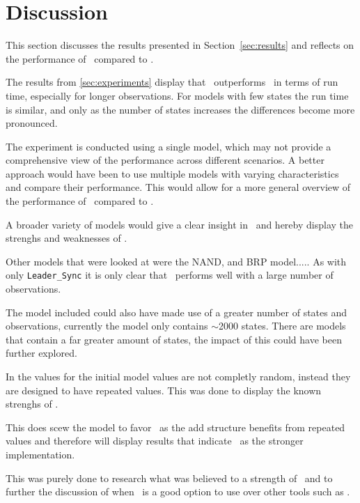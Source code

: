 \section{Discussion}\label{sec:discussion}
This section discusses the results presented in Section~\ref{sec:results} and reflects on the performance of \Cupaal\ compared to \Jajapy.

The results from \autoref{sec:experiments} display that \Cupaal\ outperforms \Jajapy\ in terms of run time, especially for longer observations.
For models with few states the run time is similar, and only as the number of states increases the differences become more pronounced.

The experiment is conducted using a single model, which may not provide a comprehensive view of the performance across different scenarios.
A better approach would have been to use multiple models with varying characteristics and compare their performance.
This would allow for a more general overview of the performance of \Cupaal\ compared to \Jajapy.

A broader variety of models would give a clear insight in \Cupaal\ and hereby display the strenghs and weaknesses of \Cupaal.

Other models that were looked at were the NAND, and BRP model.....
As with only \texttt{Leader\_Sync} it is only clear that \Cupaal\ performs well with a large number of observations.

The model included could also have made use of a greater number of states and observations, currently the model only contains $\sim$2000 states.
There are models that contain a far greater amount of states, the impact of this could have been further explored.

In  the values for the initial model values are not completly random, instead they are designed to have repeated values.
This was done to display the known strenghs of \Cupaal.

This does scew the model to favor \Cupaal\ as the \gls{add} structure benefits from repeated values and therefore will display results that indicate \Cupaal\ as the stronger implementation.

This was purely done to research what was believed to a strength of \Cupaal\ and to further the discussion of when \Cupaal\ is a good option to use over other tools such as \Jajapy.



